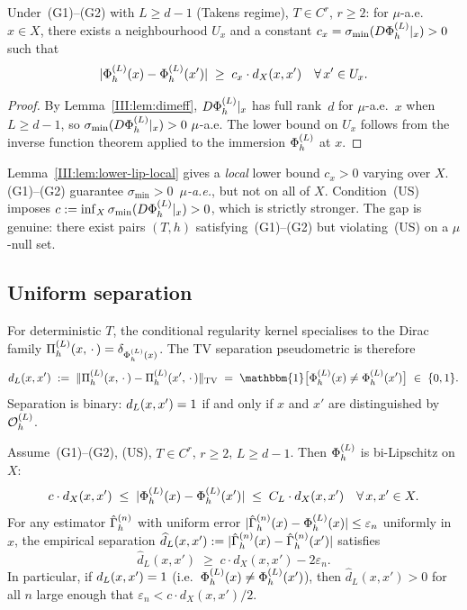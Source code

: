 \begin{lemma}
\label{III:lem:lower-lip-local}
Under~(G1)--(G2) with $L \geq d-1$ (Takens regime), $T \in C^r$, $r \geq 2$:
for $\mu$-a.e.\ $x \in X$, there exists a neighbourhood $U_x$ and a constant
$c_x = \sigma_{\min}(D\Phi_h^{(L)}|_x) > 0$ such that
\[
  |\Phi_h^{(L)}(x) - \Phi_h^{(L)}(x')| \;\geq\; c_x \cdot d_X(x,x')
  \quad\forall\, x' \in U_x.
\]
\end{lemma}

\begin{proof}
By Lemma~\ref{III:lem:dimeff}, $D\Phi_h^{(L)}|_x$ has full rank~$d$ for $\mu$-a.e.\ $x$
when $L \geq d-1$, so $\sigma_{\min}(D\Phi_h^{(L)}|_x) > 0~\mu$-a.e.
The lower bound on $U_x$ follows from the inverse function theorem applied to
the immersion $\Phi_h^{(L)}$ at $x$.
\end{proof}

\begin{remark}
Lemma~\ref{III:lem:lower-lip-local} gives a \emph{local} lower bound $c_x > 0$
varying over $X$.
(G1)--(G2) guarantee $\sigma_{\min} > 0$~\emph{$\mu$-a.e.}, but not on all of $X$.
Condition~(US) imposes $c := \inf_X \sigma_{\min}(D\Phi_h^{(L)}|_x) > 0$, which is
strictly stronger.
The gap is genuine: there exist pairs $(T,h)$ satisfying~(G1)--(G2) but
violating~(US) on a $\mu$-null set.
\end{remark}

\subsection{Uniform separation}

For deterministic $T$, the conditional regularity kernel specialises to the
Dirac family $\Pi_h^{(L)}(x,\,\cdot\,) = \delta_{\Phi_h^{(L)}(x)}$.
The TV separation pseudometric is therefore
\[
  \preddisc{L}(x,x')
  \;:=\;
  \|\PihL(x,\,\cdot\,) - \PihL(x',\,\cdot\,)\|_{\mathrm{TV}}
  \;=\;
  \mathbbm{1}\bigl[\PhiL(x) \neq \PhiL(x')\bigr]
  \;\in\; \{0,1\}.
\]
Separation is binary: $d_{L}(x,x') = 1$ if and only if
$x$ and $x'$ are distinguished by $\mathcal{O}_h^{(L)}$.

\begin{theorem}
\label{III:thm:sep-stable}
Assume~(G1)--(G2), (US), $T \in C^r$, $r \geq 2$, $L \geq d-1$.
Then $\Phi_h^{(L)}$ is bi-Lipschitz on $X$:
\[
  c \cdot d_X(x,x') \;\leq\; |\Phi_h^{(L)}(x) - \Phi_h^{(L)}(x')| \;\leq\; C_L \cdot d_X(x,x')
  \quad\forall\, x, x' \in X.
\]
For any estimator $\hat{\Gamma}_h^{(n)}$ with uniform error
$|\hat{\Gamma}_h^{(n)}(x) - \Phi_h^{(L)}(x)| \leq \varepsilon_n$ uniformly in $x$, the
empirical separation $\widehat{d}_L(x,x') := |\hat{\Gamma}_h^{(n)}(x) - \hat{\Gamma}_h^{(n)}(x')|$
satisfies
\[
  \widehat{d}_L(x,x') \;\geq\; c \cdot d_X(x,x') - 2\varepsilon_n.
\]
In particular, if $d_{L}(x,x') = 1$ (i.e.\ $\Phi_h^{(L)}(x) \neq \Phi_h^{(L)}(x')$),
then $\widehat{d}_L(x,x') > 0$ for all $n$ large enough that
$\varepsilon_n < c \cdot d_X(x,x') / 2$.
\end{theorem}

